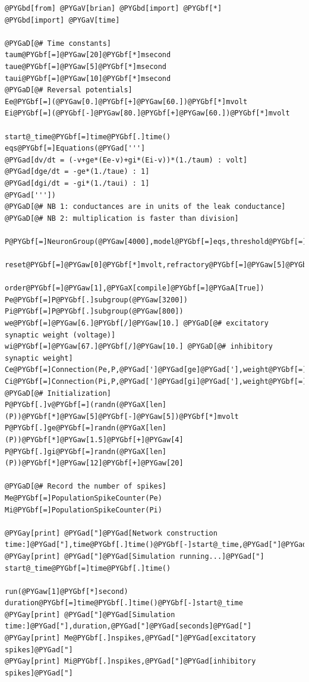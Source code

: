 \documentclass[letterpaper,10pt,english]{manual}
\begin{document}
\begin{Verbatim}[commandchars=@\[\]]
@PYGbd[from] @PYGaV[brian] @PYGbd[import] @PYGbf[*]
@PYGbd[import] @PYGaV[time]

@PYGaD[@# Time constants]
taum@PYGbf[=]@PYGaw[20]@PYGbf[*]msecond
taue@PYGbf[=]@PYGaw[5]@PYGbf[*]msecond
taui@PYGbf[=]@PYGaw[10]@PYGbf[*]msecond
@PYGaD[@# Reversal potentials]
Ee@PYGbf[=](@PYGaw[0.]@PYGbf[+]@PYGaw[60.])@PYGbf[*]mvolt
Ei@PYGbf[=](@PYGbf[-]@PYGaw[80.]@PYGbf[+]@PYGaw[60.])@PYGbf[*]mvolt

start@_time@PYGbf[=]time@PYGbf[.]time()
eqs@PYGbf[=]Equations(@PYGad[''']
@PYGad[dv/dt = (-v+ge*(Ee-v)+gi*(Ei-v))*(1./taum) : volt]
@PYGad[dge/dt = -ge*(1./taue) : 1]
@PYGad[dgi/dt = -gi*(1./taui) : 1]
@PYGad['''])
@PYGaD[@# NB 1: conductances are in units of the leak conductance]
@PYGaD[@# NB 2: multiplication is faster than division]

P@PYGbf[=]NeuronGroup(@PYGaw[4000],model@PYGbf[=]eqs,threshold@PYGbf[=]@PYGaw[10]@PYGbf[*]mvolt,\
              reset@PYGbf[=]@PYGaw[0]@PYGbf[*]mvolt,refractory@PYGbf[=]@PYGaw[5]@PYGbf[*]msecond,
              order@PYGbf[=]@PYGaw[1],@PYGaX[compile]@PYGbf[=]@PYGaA[True])
Pe@PYGbf[=]P@PYGbf[.]subgroup(@PYGaw[3200])
Pi@PYGbf[=]P@PYGbf[.]subgroup(@PYGaw[800])
we@PYGbf[=]@PYGaw[6.]@PYGbf[/]@PYGaw[10.] @PYGaD[@# excitatory synaptic weight (voltage)]
wi@PYGbf[=]@PYGaw[67.]@PYGbf[/]@PYGaw[10.] @PYGaD[@# inhibitory synaptic weight]
Ce@PYGbf[=]Connection(Pe,P,@PYGad[']@PYGad[ge]@PYGad['],weight@PYGbf[=]we,sparseness@PYGbf[=]@PYGaw[0.02])
Ci@PYGbf[=]Connection(Pi,P,@PYGad[']@PYGad[gi]@PYGad['],weight@PYGbf[=]wi,sparseness@PYGbf[=]@PYGaw[0.02])
@PYGaD[@# Initialization]
P@PYGbf[.]v@PYGbf[=](randn(@PYGaX[len](P))@PYGbf[*]@PYGaw[5]@PYGbf[-]@PYGaw[5])@PYGbf[*]mvolt
P@PYGbf[.]ge@PYGbf[=]randn(@PYGaX[len](P))@PYGbf[*]@PYGaw[1.5]@PYGbf[+]@PYGaw[4]
P@PYGbf[.]gi@PYGbf[=]randn(@PYGaX[len](P))@PYGbf[*]@PYGaw[12]@PYGbf[+]@PYGaw[20]

@PYGaD[@# Record the number of spikes]
Me@PYGbf[=]PopulationSpikeCounter(Pe)
Mi@PYGbf[=]PopulationSpikeCounter(Pi)

@PYGay[print] @PYGad["]@PYGad[Network construction time:]@PYGad["],time@PYGbf[.]time()@PYGbf[-]start@_time,@PYGad["]@PYGad[seconds]@PYGad["]
@PYGay[print] @PYGad["]@PYGad[Simulation running...]@PYGad["]
start@_time@PYGbf[=]time@PYGbf[.]time()

run(@PYGaw[1]@PYGbf[*]second)
duration@PYGbf[=]time@PYGbf[.]time()@PYGbf[-]start@_time
@PYGay[print] @PYGad["]@PYGad[Simulation time:]@PYGad["],duration,@PYGad["]@PYGad[seconds]@PYGad["]
@PYGay[print] Me@PYGbf[.]nspikes,@PYGad["]@PYGad[excitatory spikes]@PYGad["]
@PYGay[print] Mi@PYGbf[.]nspikes,@PYGad["]@PYGad[inhibitory spikes]@PYGad["]
\end{Verbatim}
\end{document}
